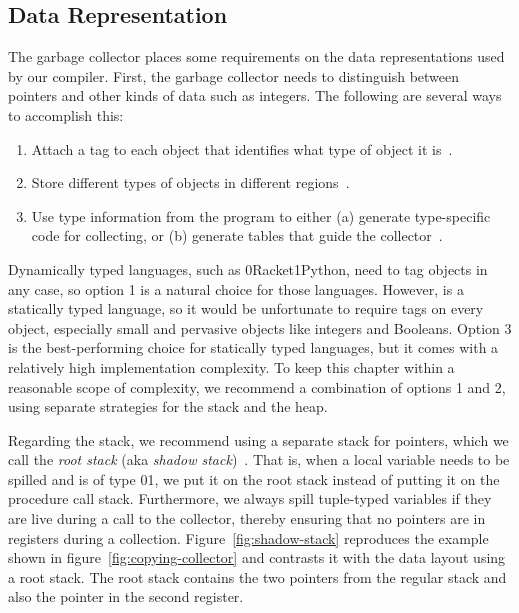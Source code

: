 \documentclass[7x10]{TimesAPriori_MIT}%
\def\racketEd{0}
\def\pythonEd{1}
\def\edition{0}
\newcommand{\racket}[1]{{\if\edition\racketEd{#1}\fi}}
\newcommand{\python}[1]{{\if\edition\pythonEd #1\fi}}
\numberwithin{theorem}{chapter}
\numberwithin{definition}{chapter}
\numberwithin{equation}{chapter}
\begin{document}
\subsection{Data Representation}
\label{sec:data-rep-gc}

The garbage collector places some requirements on the data
representations used by our compiler. First, the garbage collector
needs to distinguish between pointers and other kinds of data such as
integers. The following are several ways to accomplish this:
\begin{enumerate}
\item Attach a tag to each object that identifies what type of
  object it is~\citep{McCarthy:1960dz}.
\item Store different types of objects in different
  regions~\citep{Steele:1977ab}.
\item Use type information from the program to either (a) generate
  type-specific code for collecting, or (b) generate tables that 
  guide the collector~\citep{Appel:1989aa,Goldberg:1991aa,Diwan:1992aa}.
\end{enumerate}
Dynamically typed languages, such as \racket{Racket}\python{Python},
need to tag objects in any case, so option 1 is a natural choice for those
languages.  However, \LangVec{} is a statically typed language, so it
would be unfortunate to require tags on every object, especially small
and pervasive objects like integers and Booleans.  Option 3 is the
best-performing choice for statically typed languages, but it comes with
a relatively high implementation complexity. To keep this chapter
within a reasonable scope of complexity, we recommend a combination of options
1 and 2, using separate strategies for the stack and the heap.

Regarding the stack, we recommend using a separate stack for pointers,
which we call the \emph{root stack}
(aka \emph{shadow stack})~\citep{Siebert:2001aa,Henderson:2002aa,Baker:2009aa}.
That is, when a local variable needs to be spilled and is of type
\racket{}\python{}, we put it on the
root stack instead of putting it on the procedure call
stack. Furthermore, we always spill tuple-typed variables if they are
live during a call to the collector, thereby ensuring that no pointers
are in registers during a collection. Figure~\ref{fig:shadow-stack}
reproduces the example shown in figure~\ref{fig:copying-collector} and
contrasts it with the data layout using a root stack. The root stack
contains the two pointers from the regular stack and also the pointer
in the second register.
\end{document}
